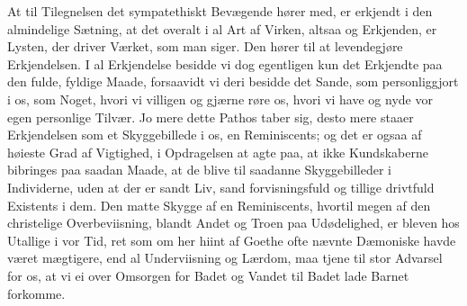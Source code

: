\documentclass[12pt,a4paper]{book}
\newcommand{\apage}[1]{\marginnote{\footnotesize\textit{[#1]}}}
\begin{document}
At til Tilegnelsen det sympatethiskt Bevægende hører med, er erkjendt i den
almindelige Sætning, at det overalt i al Art af Virken, altsaa og Erkjenden,
er Lysten, der driver Værket, som man siger. Den hører til at levendegjøre
Erkjendelsen. I al Erkjendelse besidde vi dog egentligen kun det Erkjendte
paa den fulde, fyldige Maade, forsaavidt vi deri besidde det Sande, som
personliggjort i os, som Noget, hvori vi villigen og gjærne røre os, hvori vi
have og nyde vor egen personlige Tilvær. Jo mere dette Pathos taber sig, desto
mere staaer Erkjendelsen som et Skyggebillede i os, en Reminiscents; og det er
ogsaa af høieste Grad af Vigtighed, i Opdragelsen at agte paa, at ikke
Kundskaberne bibringes paa saadan Maade, at de blive til saadanne
Skyggebilleder i Individerne, uden at der er sandt Liv, sand forvisningsfuld og
tillige drivtfuld Existents i dem. Den matte Skygge af en Reminiscents,
hvortil megen af den christelige Overbeviisning, blandt Andet og Troen paa
Udødelighed, er bleven hos Utallige i vor Tid, ret som om her hiint af Goethe
ofte nævnte Dæmoniske havde været mægtigere, end al Underviisning \apage{111} og Lærdom,
maa tjene til stor Advarsel for os, at vi ei over Omsorgen for Badet og
Vandet til Badet lade Barnet forkomme.
\end{document}
